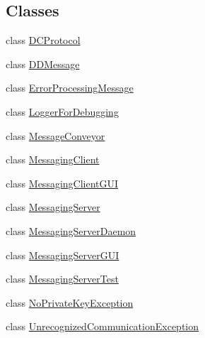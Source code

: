 \subsection*{Classes}
\begin{DoxyCompactItemize}
\item 
class \hyperlink{classgov_1_1fnal_1_1ppd_1_1dd_1_1chat_1_1DCProtocol}{D\-C\-Protocol}
\item 
class \hyperlink{classgov_1_1fnal_1_1ppd_1_1dd_1_1chat_1_1DDMessage}{D\-D\-Message}
\item 
class \hyperlink{classgov_1_1fnal_1_1ppd_1_1dd_1_1chat_1_1ErrorProcessingMessage}{Error\-Processing\-Message}
\item 
class \hyperlink{classgov_1_1fnal_1_1ppd_1_1dd_1_1chat_1_1LoggerForDebugging}{Logger\-For\-Debugging}
\item 
class \hyperlink{classgov_1_1fnal_1_1ppd_1_1dd_1_1chat_1_1MessageConveyor}{Message\-Conveyor}
\item 
class \hyperlink{classgov_1_1fnal_1_1ppd_1_1dd_1_1chat_1_1MessagingClient}{Messaging\-Client}
\item 
class \hyperlink{classgov_1_1fnal_1_1ppd_1_1dd_1_1chat_1_1MessagingClientGUI}{Messaging\-Client\-G\-U\-I}
\item 
class \hyperlink{classgov_1_1fnal_1_1ppd_1_1dd_1_1chat_1_1MessagingServer}{Messaging\-Server}
\item 
class \hyperlink{classgov_1_1fnal_1_1ppd_1_1dd_1_1chat_1_1MessagingServerDaemon}{Messaging\-Server\-Daemon}
\item 
class \hyperlink{classgov_1_1fnal_1_1ppd_1_1dd_1_1chat_1_1MessagingServerGUI}{Messaging\-Server\-G\-U\-I}
\item 
class \hyperlink{classgov_1_1fnal_1_1ppd_1_1dd_1_1chat_1_1MessagingServerTest}{Messaging\-Server\-Test}
\item 
class \hyperlink{classgov_1_1fnal_1_1ppd_1_1dd_1_1chat_1_1NoPrivateKeyException}{No\-Private\-Key\-Exception}
\item 
class \hyperlink{classgov_1_1fnal_1_1ppd_1_1dd_1_1chat_1_1UnrecognizedCommunicationException}{Unrecognized\-Communication\-Exception}
\end{DoxyCompactItemize}
